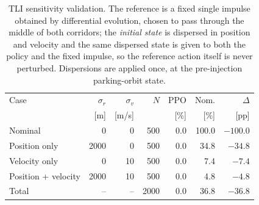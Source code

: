 \begin{table}[hbt!]
\centering
\small
\caption{TLI sensitivity validation. The reference is a fixed single impulse obtained by differential evolution, chosen to pass through the middle of both corridors; the \emph{initial state} is dispersed in position and velocity and the same dispersed state is given to both the policy and the fixed impulse, so the reference action itself is never perturbed. Dispersions are applied once, at the pre-injection parking-orbit state.}
\label{tab:tli_sensitivity}
\begin{tabular}{lrrrrrr}
\toprule
Case & $\sigma_r$ & $\sigma_v$ & $N$ & PPO & Nom. & $\Delta$ \\
 & [m] & [m/s] & & [\%] & [\%] & [pp] \\
\midrule
Nominal & 0 & 0 & 500 & 0.0 & 100.0 & $-100.0$ \\
Position only & 2000 & 0 & 500 & 0.0 & 34.8 & $-34.8$ \\
Velocity only & 0 & 10 & 500 & 0.0 & 7.4 & $-7.4$ \\
Position + velocity & 2000 & 10 & 500 & 0.0 & 4.8 & $-4.8$ \\
\midrule
Total & -- & -- & 2000 & 0.0 & 36.8 & $-36.8$ \\
\bottomrule
\end{tabular}
\end{table}